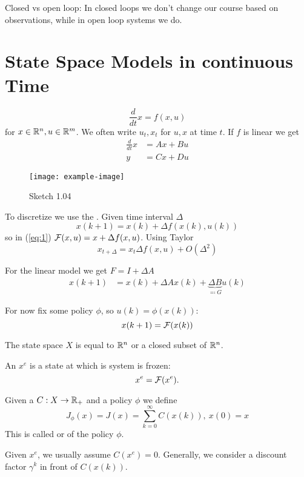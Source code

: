 Closed vs open loop: In closed loops we don't change our course based on observations, while in open loop systems we do.

\section{State Space Models in continuous Time}

\[\frac{d}{dt}x=f(x,u)\]
for \(x\in \mathbb{R}^n, u\in \mathbb{R}^m\). We often write \(u_t,x_t\) for \(u,x\) at time \(t\).
If \(f\) is linear we get
\begin{align*}
    \frac{d}{dt}x&=Ax+Bu\\
    y&=Cx+Du
\end{align*}

\begin{figure}[H]\label{fig:1.04}
    \centering
    \texttt{[image: example-image]}
    \caption{Sketch 1.04}
\end{figure}

To discretize we use the . Given time interval \(\Delta\)
\[x(k+1)=x(k)+\Delta f(x(k),u(k))\]
so in (\ref{eq:1}) \(\mathcal{F}(x,u)=x+\Delta f(x,u)\).
Using Taylor
\[x_{t+ \Delta}=x_t \Delta f(x,u)+O(\Delta^2)\]

For the linear model we get 
\(F=I+\Delta A\)
\begin{align*}
    x(k+1) &= x(k)+\Delta Ax(k)+\underbrace{\Delta B}_{\eqqcolon G}u(k)
\end{align*}

For now fix some policy \(\phi\), so \(u(k)=\phi(x(k))\):
\[x(k+1)=\mathcal{F}(x(k))\]
\begin{assumption}\label{ass:1.2}
    The state space \(X\) is equal to \(\mathbb{R}^n\) or a closed subset of \(\mathbb{R}^n\).
\end{assumption}

\begin{definition}\label{def:1.3}
    An  \(x^e\) is a state at which is system is frozen:
    \[x^e=\mathcal{F}(x^e).\]
\end{definition}


\begin{definition}\label{def:1.4}
    Given a  \(C:X\to \mathbb{R}_+\) and a 
    policy \(\phi\) we define 
    \[J_\phi(x)=J(x)=\sum_{k=0}^\infty C(x(k)),\ x(0)=x\] 
    This is called  or  of the policy \(\phi\).
\end{definition}
Given \(x^e\), we usually assume \(C(x^e)=0\). Generally, we consider a discount factor \(\gamma^k\) in front of \(C(x(k))\).

